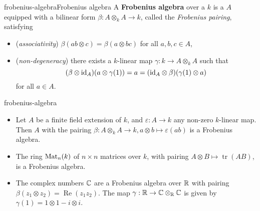 
\begin{topic}{frobenius-algebra}{Frobenius algebra}
    A \textbf{Frobenius algebra} over a  $k$ is a  $A$ equipped with a bilinear form $\beta : A \otimes_k A \to k$, called the \textit{Frobenius pairing}, satisfying
    \begin{itemize}
        \item (\textit{associativity}) $\beta(ab \otimes c) = \beta(a \otimes bc)$ for all $a, b, c \in A$,
        \item (\textit{non-degeneracy}) there exists a $k$-linear map $\gamma : k \to A \otimes_k A$ such that 
        \[ (\beta \otimes \textup{id}_A)(a \otimes \gamma(1)) = a = (\textup{id}_A \otimes \beta)(\gamma(1) \otimes a) \]
        for all $a \in A$.
    \end{itemize}
\end{topic}

\begin{example}{frobenius-algebra}
    \begin{itemize}
        \item Let $A$ be a finite field extension of $k$, and $\varepsilon : A \to k$ any non-zero $k$-linear map. Then $A$ with the pairing $\beta : A \otimes_k A \to k, a \otimes b \mapsto \varepsilon(ab)$ is a Frobenius algebra.
        \item The ring $\textup{Mat}_n(k)$ of $n \times n$ matrices over $k$, with pairing $A \otimes B \mapsto \operatorname{tr}(AB)$, is a Frobenius algebra.
        \item The complex numbers $\mathbb{C}$ are a Frobenius algebra over $\mathbb{R}$ with pairing $\beta(z_1 \otimes z_2) = \operatorname{Re}(z_1 z_2)$. The map $\gamma : \mathbb{R} \to \mathbb{C} \otimes_{\mathbb{R}} \mathbb{C}$ is given by $\gamma(1) = 1 \otimes 1 - i \otimes i$.
    \end{itemize}
\end{example}

